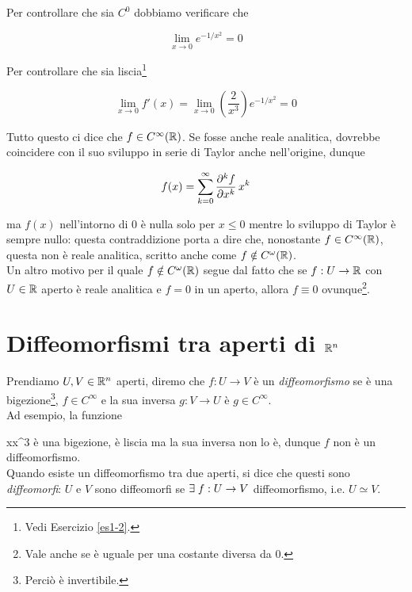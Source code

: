 Per controllare che sia $ C^{0} $ dobbiamo verificare che

\begin{equation}
	\lim_{x \to 0} e^{-1/x^{2}} = 0
\end{equation}

Per controllare che sia liscia\footnote{%
	Vedi Esercizio \ref{es1-2}.}

\begin{equation}
	\lim_{x \to 0} f' (x) = \lim_{x \to 0} \left(\dfrac{2}{x^{3}}\right) e^{-1/x^{2}} = 0
\end{equation}

Tutto questo ci dice che $ f \in C^{\infty}(\mathbb{R}) $. Se fosse anche reale analitica, dovrebbe coincidere con il suo sviluppo in serie di Taylor anche nell'origine, dunque

\begin{align}
	\begin{split}
		f(x) = \sum_{k=0}^{\infty} \pdv[k]{f}{x} (0) \, x^{k}
	\end{split}
\end{align}

ma $ f(x) $ nell'intorno di 0 è nulla solo per $ x \leqslant 0 $ mentre lo sviluppo di Taylor è sempre nullo: questa contraddizione porta a dire che, nonostante $ f \in C^{\infty}(\mathbb{R}) $, questa non è reale analitica, scritto anche come $ f \notin C^{\omega}(\mathbb{R}) $.\\
Un altro motivo per il quale $ f \notin C^{\omega}(\mathbb{R}) $ segue dal fatto che se $ f : U \to \mathbb{R} $ con $ U \in \mathbb{R} $ aperto è reale analitica e $ f = 0 $ in un aperto, allora $ f \equiv 0 $ ovunque\footnote{%
	Vale anche se è uguale per una costante diversa da 0.}.

\section{Diffeomorfismi tra aperti di $ \mathbb{R}^{n} $}

Prendiamo $ U, V \in \mathbb{R}^{n} $ aperti, diremo che $ f : U \to V $ è un \textit{diffeomorfismo} se è una bigezione\footnote{%
	Perciò è invertibile.%
}, $ f \in C^{\infty} $ e la sua inversa $ g : V \to U $ è  $ g \in C^{\infty} $.\\
Ad esempio, la funzione

	{\R}{\R}
	{x}{x^{3}}
è una bigezione, è liscia ma la sua inversa non lo è, dunque $ f $ non è un diffeomorfismo.\\
Quando esiste un diffeomorfismo tra due aperti, si dice che questi sono \textit{diffeomorfi}: $ U $ e $ V $ sono diffeomorfi se $ \exists \; f : U \to V $ diffeomorfismo, i.e. $ U \simeq V $.\\

